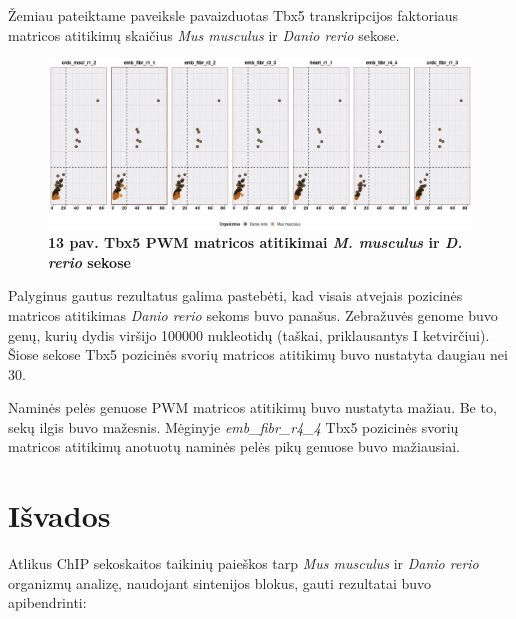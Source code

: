 \documentclass[12pt]{article}
\begin{document}
Žemiau pateiktame paveiksle pavaizduotas Tbx5 transkripcijos faktoriaus matricos
atitikimų skaičius \emph{Mus musculus} ir \emph{Danio rerio} sekose.

\begin{figure}[htb]
    \begin{center}
        \includegraphics[width=1\linewidth]{../Figures/PWM_matches_all.png}
        \vspace{-2\baselineskip}
        \caption*{\small\textbf{13 pav. Tbx5 PWM matricos atitikimai
        \emph{M. musculus} ir \emph{D. rerio} sekose}}
        \label{fig:13}
    \end{center}
\end{figure}

Palyginus gautus rezultatus galima pastebėti, kad visais atvejais pozicinės
matricos atitikimas \emph{Danio rerio} sekoms buvo panašus. Zebražuvės genome
buvo genų, kurių dydis viršijo 100000 nukleotidų (taškai, priklausantys I
ketvirčiui). Šiose sekose Tbx5 pozicinės svorių matricos atitikimų buvo
nustatyta daugiau nei 30.

Naminės pelės genuose PWM matricos atitikimų buvo nustatyta mažiau. Be to, sekų
ilgis buvo mažesnis. Mėginyje \emph{emb\_fibr\_r4\_4} Tbx5 pozicinės svorių
matricos atitikimų anotuotų naminės pelės pikų genuose buvo mažiausiai.

\newpage


\section{Išvados}
Atlikus ChIP sekoskaitos taikinių paieškos tarp \emph{Mus musculus} ir
\emph{Danio rerio} organizmų analizę, naudojant sintenijos blokus, gauti
rezultatai buvo apibendrinti:
\end{document}
